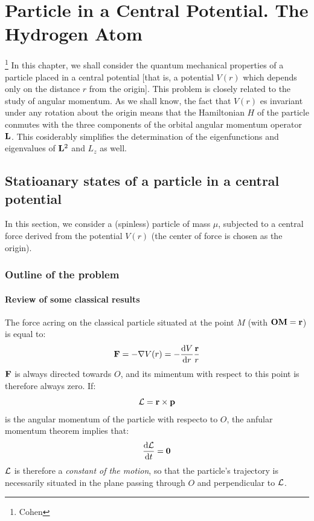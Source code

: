 \chapter{Particle in a Central Potential. The Hydrogen Atom}\footnote{Cohen}
In this chapter, we shall consider the quantum mechanical properties of a particle placed in a central potential [that is, a potential $V(r)$ which depends only on the distance $r$ from the origin]. This problem is closely related to the study of angular momentum. As we shall know, the fact that $V(r)$ es invariant under any rotation about the origin means that the Hamiltonian $H$ of the particle conmutes with the three components of the orbital angular momentum operator $\vb{L}$. This cosiderably simplifies the determination of the eigenfunctions and eigenvalues of $\vb{L}^2$ and $L_z$ as well.



\section{Statioanary states of a particle in a central potential}
In this section, we consider a (spinless) particle of mass $\mu$, subjected to a central force derived from the potential $V(r)$ (the center of force is chosen as the origin).
\subsection{Outline of the problem}
\subsubsection{Review of some classical results}
The force acring on the classical particle situated at the point $M$ (with $\vb{OM}=\vb{r}$) is equal to:
\begin{equation}\label{A-1}
	\vb{F}=-\nabla V(r)=-\dv{V}{r}\frac{\vb{r}}{r}
\end{equation}
$\vb{F}$ is always directed towards $O$,  and its mimentum with respect to this point is therefore always zero. If:
\begin{equation}\label{A-2}
	\vb{\mathcal{L}}=\vb{r}\times\vb{p}
\end{equation}
is the angular momentum of the particle with respecto to $O$, the anfular momentum theorem implies that:
\begin{equation}\label{A-3}
	\dv{\vb{\mathcal{L}}}{t}=\vb{0}
\end{equation}
$\vb{\mathcal{L}}$ is therefore a \textit{constant of the motion}, so that the particle's trajectory is necessarily situated in the plane passing through $O$ and perpendicular to $\vb{\mathcal{L}}$.

